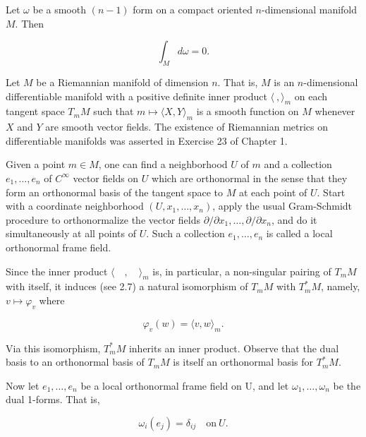 \begin{corollary*}
Let $\omega$ be a smooth $(n-1)$ form on a compact oriented $n$-dimensional manifold $M$. Then

\[
\int_M d\omega=0.
\]

\end{corollary*}

\label{thm:4.10} Let $M$ be a Riemannian manifold of dimension $n$. That is, $M$ is an $n$-dimensional differentiable manifold with a positive definite inner product $\langle \ , \rangle_m$ on each tangent space $T_{m} M$ such that $m \mapsto \langle X, Y \rangle_m$ is a smooth function on $M$ whenever $X$ and $Y$ are smooth vector fields. The existence of Riemannian metrics on differentiable manifolds was asserted in Exercise 23 of Chapter 1.

Given a point  $ m \in M $, one can find a neighborhood  $ U $ of  $ m $ and a collection  $ e_1, \ldots, e_n $ of  $ C^\infty $ vector fields on  $ U $ which are orthonormal in the sense that they form an orthonormal basis of the tangent space to  $ M $ at each point of  $ U $. Start with a coordinate neighborhood  $ (U, x_1, \ldots, x_n) $, apply the usual Gram-Schmidt procedure to orthonormalize the vector fields  $ \partial/\partial x_1, \ldots, \partial/\partial x_n $, and do it simultaneously at all points of  $ U $. Such a collection  $ e_1, \ldots, e_n $ is called a local orthonormal frame field. 

Since the inner product  $ \langle \quad, \quad\rangle_{m} $ is, in particular, a non-singular pairing of  $ T_{m} M $ with itself, it induces (see 2.7) a natural isomorphism of  $ T_{m} M $ with  $ T_{m}^{*} M $, namely,  $ v \mapsto \varphi_{v} $ where

\begin{equation}
\tag{1}\label{eq:4.10:1}
\varphi_{v}(w)=\langle v,w\rangle_{m}.
\end{equation}

Via this isomorphism,  $ T_{m}^{*} M $ inherits an inner product. Observe that the dual basis to an orthonormal basis of  $ T_{m} M $ is itself an orthonormal basis for  $ T_{m}^{*} M $.

Now let  $ e_{1}, \ldots, e_{n} $ be a local orthonormal frame field on U, and let  $ \omega_{1}, \ldots, \omega_{n} $ be the dual 1-forms. That is,

\begin{equation}
\tag{2}\label{eq:4.10:2}
\omega_{i}(e_{j})=\delta_{ij}\quad\mathrm{on}~U.
\end{equation}

